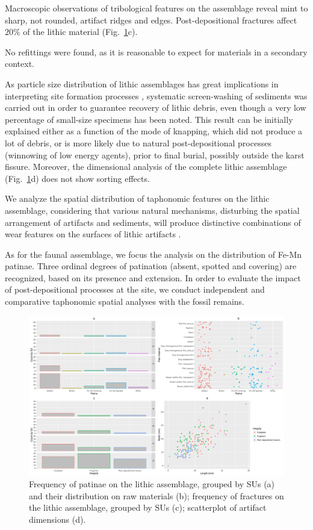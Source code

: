 \documentclass[5p,authoryear]{elsarticle} %
\begin{document}
Macroscopic observations of tribological features on the assemblage reveal mint to sharp, not rounded, artifact ridges and edges. Post-depositional fractures affect $20\%$ of the lithic material (Fig.~\ref{fig:2}c).

No refittings were found, as it is reasonable to expect for materials in a secondary context.

As particle size distribution of lithic assemblages has great implications in interpreting site formation processes \citep{Bertran2012}, systematic screen-washing of sediments was carried out in order to guarantee recovery of lithic debris, even though a very low percentage of small-size specimens has been noted. This result can be initially explained either as a function of the mode of knapping, which did not produce a lot of debris, or is more likely due to natural post-depositional processes (winnowing of low energy agents), prior to final burial, possibly outside the karst fissure. Moreover, the dimensional analysis of the complete lithic assemblage (Fig.~\ref{fig:2}d) does not show sorting effects.

We analyze the spatial distribution of taphonomic features on the lithic assemblage, considering that various natural mechanisms, disturbing the spatial arrangement of artifacts and sediments, will produce distinctive combinations of wear features on the surfaces of lithic artifacts \citep{Burroni2002}.

As for the faunal assemblage, we focus the analysis on the distribution of Fe-Mn patinae. Three ordinal degrees of patination (absent, spotted and covering) are recognized, based on its presence and extension. In order to evaluate the impact of post-depositional processes at the site, we conduct independent and comparative taphonomic spatial analyses with the fossil remains.

\begin{figure}[t]
  \centering
  \includegraphics[width=1\textwidth]{../artwork/Fig2.pdf}
  \caption{Frequency of patinae on the lithic assemblage, grouped by SUs (a) and their distribution on raw materials (b); frequency of fractures on the lithic assemblage, grouped by SUs (c); scatterplot of artifact dimensions (d).}
  \label{fig:2}
\end{figure}
\end{document}
